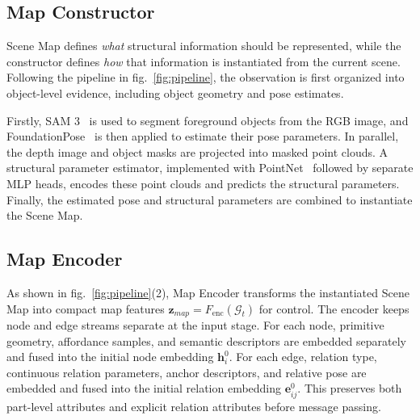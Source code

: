 \subsection{Map Constructor}
\label{sec:map_constructor}


Scene Map defines \emph{what} structural information should be represented, while the constructor defines \emph{how} that information is instantiated from the current scene. Following the pipeline in fig.~\ref{fig:pipeline}, the observation is first organized into object-level evidence, including object geometry and pose estimates.

Firstly, SAM 3~\cite{sam3} is used to segment foreground objects from the RGB image, and FoundationPose~\cite{foundationposewen2024, bundlesdfwen2023} is then applied to estimate their pose parameters. In parallel, the depth image and object masks are projected into masked point clouds. A structural parameter estimator, implemented with PointNet~\cite{Qi2017PointNet} followed by separate MLP heads, encodes these point clouds and predicts the structural parameters. Finally, the estimated pose and structural parameters are combined to instantiate the Scene Map.


\subsection{Map Encoder}
\label{sec:map_encoder}

As shown in fig.~\ref{fig:pipeline}(2), Map Encoder transforms the instantiated Scene Map into compact map features $\mathbf{z}_{map} = F_{\mathrm{enc}}(\mathcal{G}_t)$ for control.
The encoder keeps node and edge streams separate at the input stage. For each node, primitive geometry, affordance samples, and semantic descriptors are embedded separately and fused into the initial node embedding $\mathbf{h}_i^0$. For each edge, relation type, continuous relation parameters, anchor descriptors, and relative pose are embedded and fused into the initial relation embedding $\mathbf{e}_{ij}^0$. This preserves both part-level attributes and explicit relation attributes before message passing.

